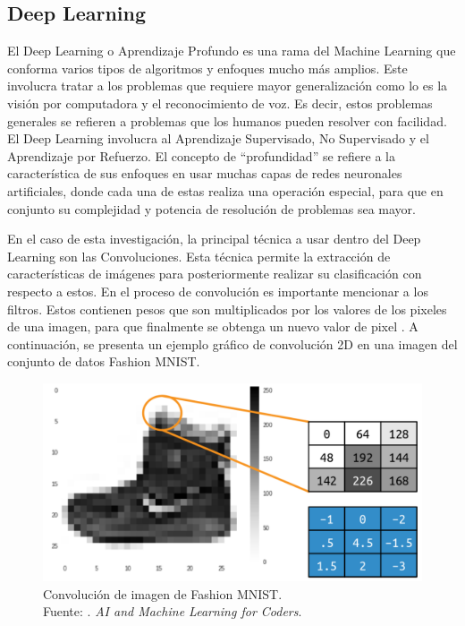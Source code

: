 \subsection{Deep Learning}

El Deep Learning o Aprendizaje Profundo es una rama del Machine Learning que conforma varios tipos de algoritmos y enfoques mucho más amplios. Este involucra tratar a los problemas que requiere mayor generalización como lo es la visión por computadora y el reconocimiento de voz. Es decir, estos problemas generales se refieren a problemas que los humanos pueden resolver con facilidad. El Deep Learning involucra al Aprendizaje Supervisado, No Supervisado y el Aprendizaje por Refuerzo. El concepto de “profundidad” se refiere a la característica de sus enfoques en usar muchas capas de redes neuronales artificiales, donde cada una de estas realiza una operación especial, para que en conjunto su complejidad y potencia de resolución de problemas sea mayor. \parencite{bk_hurbans2020grokking}

En el caso de esta investigación, la principal técnica a usar dentro del Deep Learning son las Convoluciones. Esta técnica permite la extracción de características de imágenes para posteriormente realizar su clasificación con respecto a estos. En el proceso de convolución es importante mencionar a los filtros. Estos contienen pesos que son multiplicados por los valores de los pixeles de una imagen, para que finalmente se obtenga un nuevo valor de pixel \parencite{bk_moroney2020aiandml}. A continuación, se presenta un ejemplo gráfico de convolución 2D en una imagen del conjunto de datos Fashion MNIST.

\begin{figure}[H]
	\begin{center}
		\includegraphics[width=1.00\textwidth]{2/figures/cnn_fash_mnist.png}
		\caption[Convolución de imagen de Fashion MNIST]{Convolución de imagen de Fashion MNIST. \\
		Fuente: \cite{bk_moroney2020aiandml}. \textit{AI and Machine Learning for Coders}.}
		\label{2:fig201}
	\end{center}
\end{figure}

